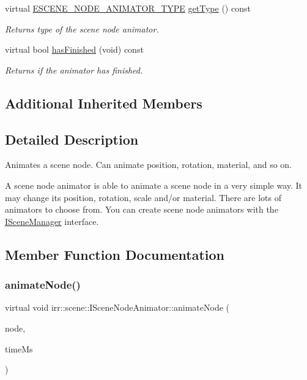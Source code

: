 \begin{DoxyCompactItemize}
virtual \hyperlink{namespaceirr_1_1scene_a327a1e43872705cf8f3f3342fb307d19}{E\+S\+C\+E\+N\+E\+\_\+\+N\+O\+D\+E\+\_\+\+A\+N\+I\+M\+A\+T\+O\+R\+\_\+\+T\+Y\+PE} \hyperlink{classirr_1_1scene_1_1ISceneNodeAnimator_a8d00cd0bc44945c617c0b8fa5c6ddcd5}{get\+Type} () const
\begin{DoxyCompactList}\small\item\em Returns type of the scene node animator. \end{DoxyCompactList}\item 
virtual bool \hyperlink{classirr_1_1scene_1_1ISceneNodeAnimator_a77fd626155079b11327f0bd775e85425}{has\+Finished} (void) const
\begin{DoxyCompactList}\small\item\em Returns if the animator has finished. \end{DoxyCompactList}\end{DoxyCompactItemize}
\subsection*{Additional Inherited Members}


\subsection{Detailed Description}
Animates a scene node. Can animate position, rotation, material, and so on. 

A scene node animator is able to animate a scene node in a very simple way. It may change its position, rotation, scale and/or material. There are lots of animators to choose from. You can create scene node animators with the \hyperlink{classirr_1_1scene_1_1ISceneManager}{I\+Scene\+Manager} interface. 

\subsection{Member Function Documentation}
\mbox{\label{classirr_1_1scene_1_1ISceneNodeAnimator_ab2170d133db16de148d0f6841c06bc84}} 
\subsubsection{\texorpdfstring{animate\+Node()}{animateNode()}}
{\footnotesize\ttfamily virtual void irr\+::scene\+::\+I\+Scene\+Node\+Animator\+::animate\+Node (\begin{DoxyParamCaption}\item[{\hyperlink{classirr_1_1scene_1_1ISceneNode}{I\+Scene\+Node} $\ast$}]{node,  }\item[{\hyperlink{namespaceirr_a0416a53257075833e7002efd0a18e804}{u32}}]{time\+Ms }\end{DoxyParamCaption})\hspace{0.3cm}{\ttfamily [pure virtual]}}



